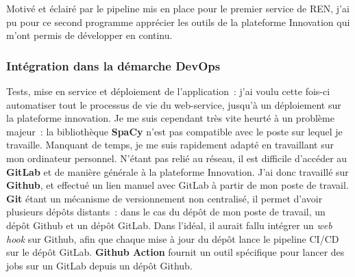 Motivé et éclairé par le pipeline mis en place pour le premier service de REN, j'ai pu pour ce second programme apprécier les outils de la plateforme Innovation qui m'ont permis de développer en continu.
\label{section 3.2.2 - React}

\subsubsection{Intégration dans la démarche DevOps}
Tests, mise en service et déploiement de l'application~: j'ai voulu cette fois-ci automatiser tout le processus de vie du web-service, jusqu'à un déploiement sur la plateforme innovation. Je me suis cependant très vite heurté à un problème majeur~: la bibliothèque \textbf{SpaCy} n'est pas compatible avec le poste sur lequel je travaille. Manquant de temps, je me suis rapidement adapté en travaillant sur mon ordinateur personnel. N'étant pas relié au réseau, il est difficile d'accéder au \textbf{GitLab} et de manière générale à la plateforme Innovation. J'ai donc travaillé sur \textbf{Github}, et effectué un lien manuel avec GitLab à partir de mon poste de travail. \textbf{Git} étant un mécanisme de versionnement non centralisé, il permet d'avoir plusieurs dépôts distants~: dans le cas du dépôt de mon poste de travail, un dépôt Github et un dépôt GitLab. Dans l'idéal, il aurait fallu intégrer un \textit{web hook} sur Github, afin que chaque mise à jour du dépôt lance le pipeline CI/CD sur le dépôt GitLab. \textbf{Github Action} fournit un outil spécifique pour lancer des jobs sur un GitLab depuis un dépôt Github.
\newline

